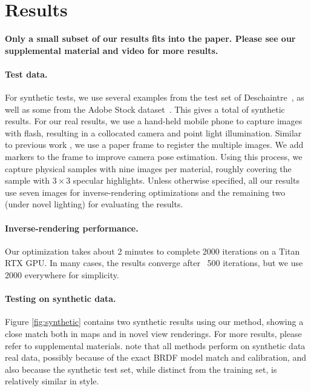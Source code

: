 \section{Results}
\label{sec:results}
%
\textbf{Only a small subset of our results fits into the paper. Please see our supplemental material and video for more results.}
%
\paragraph{Test data.}
For synthetic tests, we use several examples from the test set of Deschaintre~, as well as some from the Adobe Stock dataset~\cite{Li2018}. This gives a total of \totSynthetic synthetic results.
For our real results, we use a hand-held mobile phone to capture images with flash, resulting in a collocated camera and point light illumination.
Similar to previous work \cite{Hui2017,Deschaintre2019}, we use a paper frame to register the multiple images.
We add markers to the frame to improve camera pose estimation.
Using this process, we capture \totReal physical samples with nine images per material, roughly covering the sample with $3 \times 3$ specular highlights. 
Unless otherwise specified, all our results use seven images for inverse-rendering optimizations and the remaining two (under novel lighting) for evaluating the results.
%
\paragraph{Inverse-rendering performance.}
Our optimization takes about 2 minutes to complete 2000 iterations on a Titan RTX GPU. In many cases, the results converge after ~500 iterations, but we use 2000 everywhere for simplicity.
%

%
\paragraph{Testing on synthetic data.}
Figure \ref{fig:synthetic} contains two synthetic results using our method, showing a close match both in maps and in novel view renderings. For more results, please refer to supplemental materials.  note that all methods perform  on synthetic data  real data, possibly because of the exact BRDF model match and  calibration, and also
because the synthetic test set, while distinct from the training set, is relatively similar in style.
%


%
